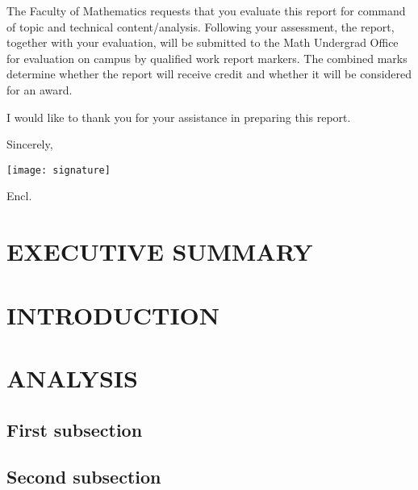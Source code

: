 \documentclass[titlepage, 12pt]{article}
\let\oldsection\section
\renewcommand\section[1]{\oldsection{\MakeUppercase{#1}}}
\begin{document}
\reportsummary{}

The Faculty of Mathematics requests that you evaluate this report for command
of topic and technical content/analysis. Following your assessment, the report,
together with your evaluation, will be submitted to the Math Undergrad Office
for evaluation on campus by qualified work report markers. The combined
marks determine whether the report will receive credit and whether it will
be considered for an award.

I would like to thank you for your assistance in preparing this report.

Sincerely,

\texttt{[image: signature]}

\student
\vfill
Encl.
\newpage
\renewcommand\contentsname{
    \begin{center}
        \normalsize \textbf{TABLE OF CONTENTS}
    \end{center}
}
\renewcommand\listfigurename{
    \begin{center}
        \normalsize \textbf{LIST OF FIGURES}
    \end{center}
}
\doublespacing
\tableofcontents
\listoffigures
\newpage
\setcounter{secnumdepth}{0}  %
\section{Executive Summary}

\lipsum

\newpage
\setcounter{secnumdepth}{3}
\section{Introduction}

\lipsum

\section{Analysis}

\subsection{First subsection}

\lipsum

\subsection{Second subsection}
\end{document}

